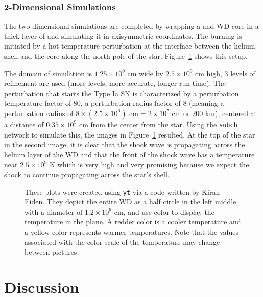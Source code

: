 \documentclass[preprint]{aastex62}
\begin{document}
        
    \subsubsection{2-Dimensional Simulations}
  
      The two-dimensional simulations are completed by wrapping a  and  WD core in a thick layer of  and simulating it in axisymmetric coordinates. The burning is initiated by a hot temperature perturbation at the interface between the helium shell and the core along the north pole of the star. Figure~\ref{fig:subchsims} shows this setup. 
      
         
      
      The domain of simulation is $1.25 \times 10^9$ cm wide by $2.5 \times 10^9$ cm high, 3 levels of refinement are used (more levels, more accurate, longer run time). The perturbation that starts the Type Ia SN is characterized by a perturbation temperature factor of 80, a perturbation radius factor of 8 (meaning a perturbation radius of $8 \times (2.5 \times 10^6) \text{ cm} = 2 \times 10^7 \text{ cm}$ or 200 km), centered at a distance of $0.35 \times 10^9$ cm from the center from the star. Using the {\tt subch} network to simulate this, the images in Figure~\ref{fig:subchsims} resulted. At the top of the star in the second image, it is clear that the shock wave is propagating across the helium layer of the WD and that the front of the shock wave has a temperature near $2.5 \times 10^9$ K which is very high and very promising because we expect the shock to continue propagating across the star's shell. 
      
      \begin{figure}
        \caption{These plots were created using {\tt yt} via a code written by Kiran Eiden. They depict the entire WD as a half circle in the left middle, with a diameter of $1.2 \times 10^9$ cm, and use color to display the temperature in the plane. A redder color is a cooler temperature and a yellow color represents warmer temperatures. Note that the values associated with the color scale of the temperature may change between pictures. 
          }
        \label{fig:subchsims}
      \end{figure}

   \newpage

\section{Discussion}
\end{document}
